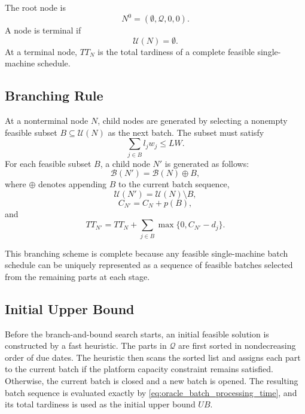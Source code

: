 \documentclass[letterpaper, 10 pt, conference]{ieeeconf}  %
\begin{document}
The root node is
\begin{equation}
	N^0=(\emptyset,\mathcal{Q},0,0).
\end{equation}
A node is terminal if
\begin{equation}
	\mathcal{U}(N)=\emptyset .
\end{equation}
At a terminal node, $TT_N$ is the total tardiness of a complete feasible
single-machine schedule.

\subsection{Branching Rule}

At a nonterminal node $N$, child nodes are generated by selecting a nonempty
feasible subset $B\subseteq \mathcal{U}(N)$ as the next batch. The subset
must satisfy
\begin{equation}
	\sum_{j\in B} l_jw_j \le LW .
\end{equation}
For each feasible subset $B$, a child node $N'$ is generated as follows:
\begin{equation}
	\mathcal{B}(N')
	=
	\mathcal{B}(N)\oplus B,
\end{equation}
where $\oplus$ denotes appending $B$ to the current batch sequence,
\begin{equation}
	\mathcal{U}(N')
	=
	\mathcal{U}(N)\setminus B,
\end{equation}
\begin{equation}
	C_{N'}
	=
	C_N+p(B),
\end{equation}
and
\begin{equation}
	TT_{N'}
	=
	TT_N
	+
	\sum_{j\in B}
	\max\{0,C_{N'}-d_j\}.
\end{equation}

This branching scheme is complete because any feasible single-machine batch
schedule can be uniquely represented as a sequence of feasible batches
selected from the remaining parts at each stage.

\subsection{Initial Upper Bound}

Before the branch-and-bound search starts, an initial feasible solution is
constructed by a fast heuristic. The parts in $\mathcal{Q}$ are first sorted
in nondecreasing order of due dates. The heuristic then scans the sorted
list and assigns each part to the current batch if the platform capacity
constraint remains satisfied. Otherwise, the current batch is closed and a
new batch is opened. The resulting batch sequence is evaluated exactly by
\eqref{eq:oracle_batch_processing_time}, and its total tardiness is used as
the initial upper bound $UB$.
\end{document}
